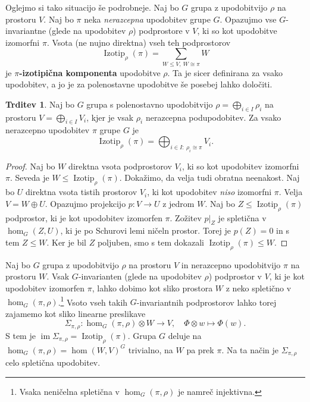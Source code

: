 \documentclass[11pt]{book}
\DeclareMathOperator\image{im}
\DeclareMathOperator\Izotip{Izotip}
\def\definicija{\color{rdeca}\bf}
\theoremstyle{definition}
\theoremstyle{zgled}
\theoremstyle{zgledbrezstevilke}
\theoremstyle{odprtproblem}
\theoremstyle{domacanaloga}
\newenvironment{dokaz}
    {\color{siva}\begin{proof}}
    {\end{proof}}
\theoremstyle{izrek}
\newtheorem{trditev}[theorem]{Trditev}
\begin{document}
Oglejmo si tako situacijo še podrobneje. Naj bo $G$ grupa z upodobitvijo $\rho$ na prostoru $V$. Naj bo $\pi$ neka \emph{nerazcepna} upodobitev grupe $G$. Opazujmo vse $G$-invariantne (glede na upodobitev $\rho$) podprostore v $V$, ki so kot upodobitve izomorfni $\pi$. Vsota (ne nujno direktna) vseh teh podprostorov
\[
    \textstyle \Izotip_{\rho}(\pi) = \sum_{W \leq V, \ W \cong \pi} W
\]
je {\definicija $\pi$-izotipična komponenta} upodobitve $\rho$. Ta je sicer definirana za vsako upodobitev, a jo je za polenostavne upodobitve še posebej lahko določiti.

\begin{trditev}
Naj bo $G$ grupa s polenostavno upodobitvijo $\rho = \bigoplus_{i \in I} \rho_i$ na prostoru $V = \bigoplus_{i \in I} V_i$, kjer je vsak $\rho_i$ nerazcepna podupodobitev. Za vsako nerazcepno upodobitev $\pi$ grupe $G$ je
\[
    \textstyle \Izotip_{\rho}(\pi) = \bigoplus_{i \in I \colon \ \rho_i \cong \pi} V_i.
\]
\end{trditev}
\begin{dokaz}    
Naj bo $W$ direktna vsota podprostorov $V_i$, ki so kot upodobitev izomorfni $\pi$. Seveda je $W \leq \Izotip_{\rho}(\pi)$. Dokažimo, da velja tudi obratna neenakost. Naj bo $U$ direktna vsota tistih prostorov $V_i$, ki kot upodobitev \emph{niso} izomorfni $\pi$. Velja $V = W \oplus U$. Opazujmo projekcijo $p \colon V \to U$ z jedrom $W$. Naj bo $Z \leq \Izotip_{\rho}(\pi)$ podprostor, ki je kot upodobitev izomorfen $\pi$. Zožitev $p|_Z$ je spletična v $\hom_G(Z, U)$, ki je po Schurovi lemi ničeln prostor. Torej je $p(Z) = 0$ in s tem $Z \leq W$. Ker je bil $Z$ poljuben, smo s tem dokazali $\Izotip_{\rho}(\pi) \leq W$.
\end{dokaz}

Naj bo $G$ grupa z upodobitvijo $\rho$ na prostoru $V$ in nerazcepno upodobitvijo $\pi$ na prostoru $W$. Vsak $G$-invarianten (glede na upodobitev $\rho$) podprostor v $V$, ki je kot upodobitev izomorfen $\pi$, lahko dobimo kot sliko prostora $W$ z neko spletično v $\hom_G(\pi, \rho)$.\footnote{Vsaka neničelna spletična v $\hom_G(\pi, \rho)$ je namreč injektivna.} Vsoto vseh takih $G$-invariantnih podprostorov lahko torej zajamemo kot sliko linearne preslikave
\[
    \Sigma_{\pi, \rho} \colon \hom_G(\pi, \rho) \otimes W \to V, \quad
    \Phi \otimes w \mapsto \Phi(w).
\]
S tem je $\image \Sigma_{\pi, \rho} = \Izotip_{\rho}(\pi)$. Grupa $G$ deluje na $\hom_G(\pi, \rho) = \hom(W,V)^G$ trivialno, na $W$ pa prek $\pi$. Na ta način je $\Sigma_{\pi, \rho}$ celo spletična upodobitev.
\end{document}
